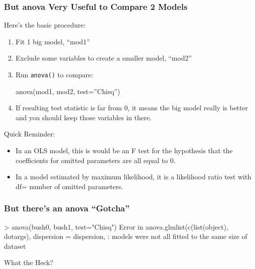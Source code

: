 \documentclass[10pt,english]{beamer}
\begin{document}

\begin{frame}
  \frametitle{But anova Very Useful to Compare 2 Models}

  Here's the basic procedure:

  \begin{enumerate}
  \item Fit 1 big model, ``mod1''
  \item Exclude some variables to create a smaller model, ``mod2''
  \item Run \texttt{anova()} to compare:

      anova(mod1, mod2, test=''Chisq'')

   \item If resulting test statistic is far from 0, it means the big
     model really is better and you should keep those variables in there.
   \end{enumerate}

   Quick Reminder:

   \begin{itemize}
   \item In an OLS model, this is would be an F test for the
     hypothesis that the coefficients for omitted parameters are all
     equal to 0.
   \item In a model estimated by maximum likelihood, it is a
     likelihood ratio test with df= number of omitted parameters.
   \end{itemize}
 \end{frame}



\begin{frame}
  \frametitle{But there's an anova ``Gotcha''}



\begin{Schunk}
  \begin{Soutput}
> anova(bush0, bush1, test="Chisq")
Error in anova.glmlist(c(list(object), dotargs),
  dispersion = dispersion,  :
  models were not all fitted to the same size of dataset
\end{Soutput}
\end{Schunk}

  What the Heck?
\end{frame}

\end{document}
